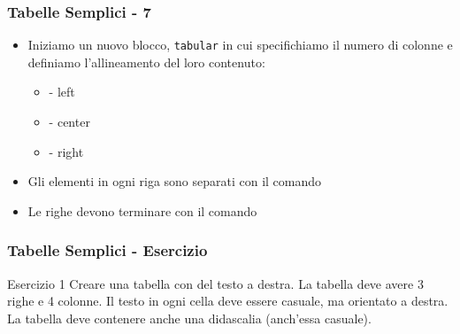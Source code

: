 \begin{frame}[fragile]
  \frametitle{Tabelle Semplici - 7}
  \begin{itemize}
    \item<1-> Iniziamo un nuovo blocco, \texttt{tabular} in cui specifichiamo il numero di colonne e definiamo l'allineamento del loro contenuto:
    \vspace{-4mm}
    \begin{itemize}
      \item {} - left
      \item {} - center
      \item {} - right
    \end{itemize}
   \item<2-> Gli elementi in ogni riga sono separati con il comando \inline{&}
   \item<3-> Le righe devono terminare con il comando \inline{\\}
  \end{itemize}


\end{frame}

\begin{frame}
  \frametitle{Tabelle Semplici - Esercizio}
  \begin{block}{Esercizio 1}
	Creare una tabella con del testo a destra. La tabella deve avere 3 righe e 4 colonne. Il testo in ogni cella deve essere casuale, ma orientato a destra. La tabella deve contenere anche una didascalia (anch'essa casuale).
\end{block}
\end{frame}